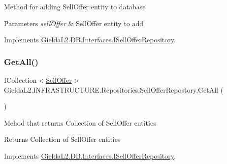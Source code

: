 Method for adding Sell\+Offer entity to database 


\begin{DoxyParams}{Parameters}
{\em sell\+Offer} & Sell\+Offer entity to add\\
\hline
\end{DoxyParams}


Implements \mbox{\hyperlink{interface_gielda_l2_1_1_d_b_1_1_interfaces_1_1_i_sell_offer_repository_a18f7f7c3a677e89bdc055a6b4a6a248a}{Gielda\+L2.\+D\+B.\+Interfaces.\+I\+Sell\+Offer\+Repository}}.

\mbox{\label{class_gielda_l2_1_1_i_n_f_r_a_s_t_r_u_c_t_u_r_e_1_1_repositories_1_1_sell_offer_repostory_a1dbfc870dcfaa42e29a440635c7b30d1}} 
\subsubsection{\texorpdfstring{GetAll()}{GetAll()}}
{\footnotesize\ttfamily I\+Collection$<$\mbox{\hyperlink{class_gielda_l2_1_1_d_b_1_1_entities_1_1_sell_offer}{Sell\+Offer}}$>$ Gielda\+L2.\+I\+N\+F\+R\+A\+S\+T\+R\+U\+C\+T\+U\+R\+E.\+Repositories.\+Sell\+Offer\+Repostory.\+Get\+All (\begin{DoxyParamCaption}{ }\end{DoxyParamCaption})}



Mehod that returns Collection of Sell\+Offer entities 

\begin{DoxyReturn}{Returns}
Collection of Sell\+Offer entities
\end{DoxyReturn}


Implements \mbox{\hyperlink{interface_gielda_l2_1_1_d_b_1_1_interfaces_1_1_i_sell_offer_repository_a9d5a9662923804caeedb86878a8635f7}{Gielda\+L2.\+D\+B.\+Interfaces.\+I\+Sell\+Offer\+Repository}}.

\mbox{\label{class_gielda_l2_1_1_i_n_f_r_a_s_t_r_u_c_t_u_r_e_1_1_repositories_1_1_sell_offer_repostory_a66ee116572e1e4c959b50d3ad1c4698d}} 
